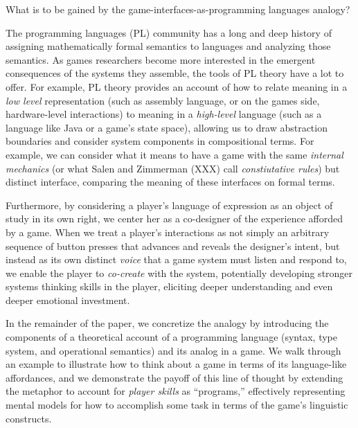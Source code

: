 \documentclass[sigconf]{acmart}
\begin{document}
What is to be gained by the game-interfaces-as-programming languages analogy?

The programming languages (PL) community has a long and deep history of
assigning mathematically formal semantics to languages and analyzing those
semantics. As games researchers become more interested in the emergent
consequences of the systems they assemble, the tools of PL theory have a
lot to offer. For example, PL theory provides an account of how to relate
meaning in a {\em low level} representation (such as assembly language, or
on the games side, hardware-level interactions) to meaning in a {\em
high-level} language (such as a language like Java or a game's state
space), allowing us to draw abstraction boundaries and consider system
components in compositional terms. For example, we can consider what it
means to have a game with the same {\em internal mechanics} (or what Salen
and Zimmerman (XXX) call {\em constiutative rules}) but distinct interface,
comparing the meaning of these interfaces on formal terms.


%
%


Furthermore, by considering a player's language of expression as an object
of study in its own right, we center her as a co-designer of the experience
afforded by a game. When we treat a player's interactions as not simply an
arbitrary sequence of button presses that advances and reveals the
designer's intent, but instead as its own distinct {\em voice} that a game
system must listen and respond to, we enable the player to {\em co-create}
with the system, potentially developing stronger systems thinking skills in
the player, eliciting deeper understanding and even deeper emotional
investment.

In the remainder of the paper, we concretize the analogy by introducing the
components of a theoretical account of a programming language (syntax, type
system, and operational semantics) and its analog in a game. We walk
through an example to illustrate how to think about a game in terms of its
language-like affordances, and we demonstrate the payoff of this line of
thought by extending the metaphor to account for {\em player skills} as
``programs,'' effectively representing mental models for how to accomplish
some task in terms of the game's linguistic constructs.
\end{document}
